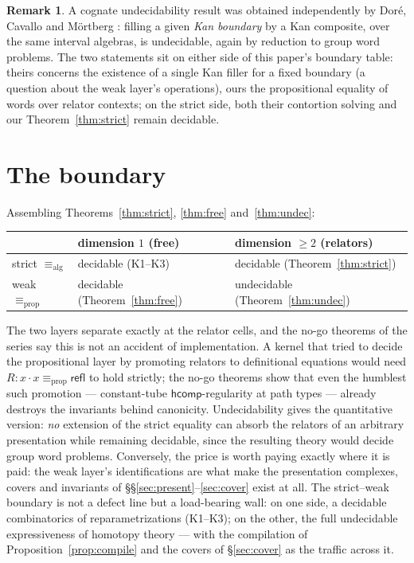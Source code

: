 \documentclass[11pt]{amsart}
\theoremstyle{definition}
\newtheorem{rem}[thm]{Remark}
\newcommand{\aconv}{\equiv_{\mathrm{alg}}}
\newcommand{\propeq}{\equiv_{\mathrm{prop}}}
\newcommand{\refl}{\mathsf{refl}}
\newcommand{\hcomp}{\mathsf{hcomp}}
\newcommand{\trns}{\mathbin{\cdot}}
\begin{document}
\begin{rem}
  A cognate undecidability result was obtained independently by
  Dor\'e, Cavallo and M\"ortberg \cite[Thm.~3.23]{DCM}: filling a
  given \emph{Kan boundary} by a Kan composite, over the same
  interval algebras, is undecidable, again by reduction to group
  word problems.  The two statements sit on either side of this
  paper's boundary table: theirs concerns the existence of a single
  Kan filler for a fixed boundary (a question about the weak layer's
  operations), ours the propositional equality of words over relator
  contexts; on the strict side, both their contortion solving and
  our Theorem~\ref{thm:strict} remain decidable.
\end{rem}

\section{The boundary}
\label{sec:boundary}

Assembling Theorems~\ref{thm:strict}, \ref{thm:free}
and~\ref{thm:undec}:

\begin{center}
\begin{tabular}{l|l|l}
  & dimension $1$ (free) & dimension $\geq 2$ (relators)\\
  \hline
  strict $\aconv$
    & decidable (K1--K3)
    & decidable (Theorem~\ref{thm:strict})\\
  weak $\propeq$
    & decidable (Theorem~\ref{thm:free})
    & undecidable (Theorem~\ref{thm:undec})
\end{tabular}
\end{center}

The two layers separate exactly at the relator cells, and the no-go
theorems of the series say this is not an accident of
implementation.  A kernel that tried to decide the propositional
layer by promoting relators to definitional equations would need
$R : x\trns x \propeq \refl$ to hold strictly; the no-go theorems
\cite{Const,Convexity} show that even the humblest such promotion
--- constant-tube $\hcomp$-regularity at path types --- already
destroys the invariants behind canonicity.  Undecidability gives the
quantitative version: \emph{no} extension of the strict equality
can absorb the relators of an arbitrary presentation while remaining
decidable, since the resulting theory would decide group word
problems.  Conversely, the price is worth paying exactly where it is
paid: the weak layer's identifications are what make the
presentation complexes, covers and invariants of
\S\S\ref{sec:present}--\ref{sec:cover} exist at all.  The
strict--weak boundary is not a defect line but a load-bearing wall:
on one side, a decidable combinatorics of reparametrizations
(K1--K3); on the other, the full undecidable expressiveness of
homotopy theory --- with the compilation of
Proposition~\ref{prop:compile} and the covers of
\S\ref{sec:cover} as the traffic across it.
\end{document}
